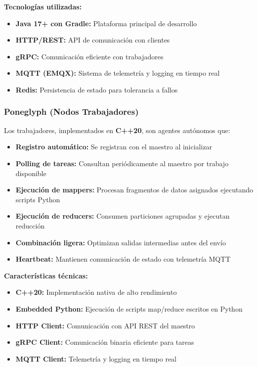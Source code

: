 \textbf{Tecnologías utilizadas:}
\begin{itemize}
    \item \textbf{Java 17+ con Gradle:} Plataforma principal de desarrollo
    \item \textbf{HTTP/REST:} API de comunicación con clientes
    \item \textbf{gRPC:} Comunicación eficiente con trabajadores
    \item \textbf{MQTT (EMQX):} Sistema de telemetría y logging en tiempo real
    \item \textbf{Redis:} Persistencia de estado para tolerancia a fallos
\end{itemize}

\subsubsection{Poneglyph (Nodos Trabajadores)}

Los trabajadores, implementados en \textbf{C++20}, son agentes autónomos que:

\begin{itemize}
    \item \textbf{Registro automático:} Se registran con el maestro al inicializar
    \item \textbf{Polling de tareas:} Consultan periódicamente al maestro por trabajo disponible
    \item \textbf{Ejecución de mappers:} Procesan fragmentos de datos asignados ejecutando scripts Python
    \item \textbf{Ejecución de reducers:} Consumen particiones agrupadas y ejecutan reducción
    \item \textbf{Combinación ligera:} Optimizan salidas intermedias antes del envío
    \item \textbf{Heartbeat:} Mantienen comunicación de estado con telemetría MQTT
\end{itemize}

\textbf{Características técnicas:}
\begin{itemize}
    \item \textbf{C++20:} Implementación nativa de alto rendimiento
    \item \textbf{Embedded Python:} Ejecución de scripts map/reduce escritos en Python
    \item \textbf{HTTP Client:} Comunicación con API REST del maestro
    \item \textbf{gRPC Client:} Comunicación binaria eficiente para tareas
    \item \textbf{MQTT Client:} Telemetría y logging en tiempo real
\end{itemize}


